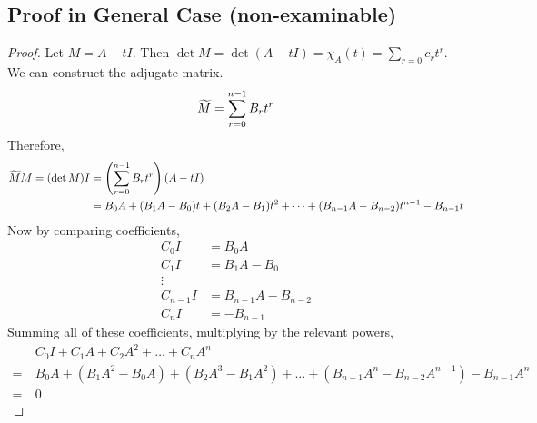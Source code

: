 \documentclass{article}
\begin{document}
\subsection{Proof in General Case (non-examinable)}
\begin{proof}
    Let $M = A - tI$. Then $\det M = \det(A - tI) = \chi_A(t) = \sum_{r=0}c_rt^r$. We can construct the adjugate matrix.
    \[ \widetilde{M} = \sum_{r=0}^{n-1} B_rt^r \]
    Therefore,
    \begin{align*}
        \widetilde{M} M = (\det M) I & = \left(\sum_{r=0}^{n-1} B_rt^r\right)(A-tI)                                              \\
                                   & = B_0A + (B_1A - B_0)t + (B_2A - B_1)t^2 + \dots + (B_{n-1}A - B_{n-2})t^{n-1} - B_{n-1}t
    \end{align*}
    Now by comparing coefficients,
    \begin{align*}
        C_0I     & = B_0A               \\
        C_1I     & = B_1A - B_0         \\
        \vdots                          \\
        C_{n-1}I & = B_{n-1}A - B_{n-2} \\
        C_nI     & = -B_{n-1}
    \end{align*}
    Summing all of these coefficients, multiplying by the relevant powers,
    \begin{align*}
         & C_0I + C_1A + C_2A^2 + \dots + C_nA^n \\=\ &B_0A + (B_1A^2 - B_0A) + (B_2A^3 - B_1A^2) + \dots + (B_{n-1}A^n - B_{n-2}A^{n-1}) - B_{n-1}A^n \\=\ &0
    \end{align*}
\end{proof}
\end{document}
